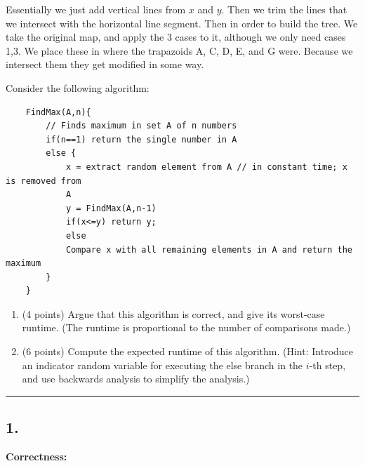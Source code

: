 \documentclass[11pt]{article}
\begin{document}
Essentially we just add vertical lines from $x$ and $y$. 
Then we trim the lines that we intersect with the horizontal line segment.
Then in order to build the tree. We take the original map, and apply the 3 cases to it,
although we only need cases 1,3. We place these in where the trapazoids A, C, D, E, and G were.
Because we intersect them they get modified in some way.








Consider the following algorithm:

\begin{verbatim}
    FindMax(A,n){
        // Finds maximum in set A of n numbers
        if(n==1) return the single number in A
        else {
            x = extract random element from A // in constant time; x is removed from
            A
            y = FindMax(A,n-1)
            if(x<=y) return y;
            else
            Compare x with all remaining elements in A and return the maximum
        }
    }
\end{verbatim}

\begin{enumerate}

\item (4 points) Argue that this algorithm is correct, and give its worst-case
    runtime. (The runtime is proportional to the number of comparisons made.)

\item (6 points) Compute the expected runtime of this algorithm.  (Hint:
    Introduce an indicator random variable for executing the else branch in the
        $i$-th step, and use backwards analysis to simplify the analysis.)

\end{enumerate}
\hrule



\subsection*{1. }
\textbf{Correctness:}
\end{document}
